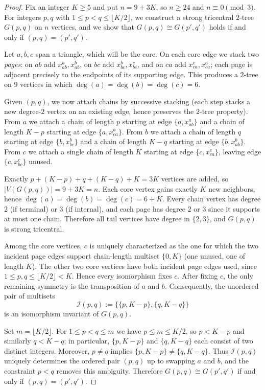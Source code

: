 \documentclass[12pt]{article}
\numberwithin{equation}{section}
\begin{document}
\begin{proof}
Fix an integer $K\ge 5$ and put $n=9+3K$, so $n\ge 24$ and $n\equiv 0\pmod 3$.
For integers $p,q$ with $1\le p<q\le \lfloor K/2\rfloor$, we construct a strong 
tricentral $2$-tree $G(p,q)$ on $n$ vertices, and we show that $G(p,q)\cong G(p',q')$ 
holds if and only if $(p,q)=(p',q')$.

Let $a,b,c$ span a triangle, which will be the core. On each core edge we stack 
two \emph{pages}: on $ab$ add $x_{ab}^a,x_{ab}^b$, on $bc$ add $x_{bc}^b,x_{bc}^c$, 
and on $ca$ add $x_{ca}^c,x_{ca}^a$; each page is adjacent precisely to the 
endpoints of its supporting edge. This produces a $2$-tree on $9$ vertices in 
which $\deg(a)=\deg(b)=\deg(c)=6$.

Given $(p,q)$, we now attach chains by successive stacking (each step stacks a 
new degree-$2$ vertex on an existing edge, hence preserves the $2$-tree property).
From $a$ we attach a chain of length $p$ starting at edge $\{a, x_{ab}^a\}$ and 
a chain of length $K-p$ starting at edge $\{a, x_{ca}^a\}$. From $b$ we attach 
a chain of length $q$ starting at edge $\{b, x_{bc}^b\}$ and a chain of length 
$K-q$ starting at edge $\{b, x_{ab}^b\}$. From $c$ we attach a single chain of 
length $K$ starting at edge $\{c, x_{ca}^c\}$, leaving edge $\{c, x_{bc}^c\}$ unused.

Exactly $p+(K-p)+q+(K-q)+K=3K$ vertices are added, so $|V(G(p,q))|=9+3K=n$.
Each core vertex gains exactly $K$ new neighbors, hence $\deg(a)=\deg(b)=\deg(c)=6+K$.
Every chain vertex has degree $2$ (if terminal) or $3$ (if internal), and each 
page has degree $2$ or $3$ since it supports at most one chain. Therefore all 
tail vertices have degree in $\{2,3\}$, and $G(p,q)$ is strong tricentral.

Among the core vertices, $c$ is uniquely characterized as the one for which the 
two incident page edges support chain-length multiset $\{0,K\}$ (one unused, one 
of length $K$). The other two core vertices have both incident page edges used, 
since $1\le p,q\le \lfloor K/2\rfloor <K$. Hence every isomorphism fixes $c$.
After fixing $c$, the only remaining symmetry is the transposition of $a$ and $b$.
Consequently, the unordered pair of multisets
\[
\mathcal{I}(p,q):=\bigl\{\{p,K-p\},\{q,K-q\}\bigr\}
\]
is an isomorphism invariant of $G(p,q)$.

Set $m=\lfloor K/2\rfloor$. For $1\le p<q\le m$ we have $p\le m\le K/2$, so 
$p<K-p$ and similarly $q<K-q$; in particular, $\{p,K-p\}$ and $\{q,K-q\}$ 
each consist of two distinct integers. Moreover, $p\neq q$ implies 
$\{p,K-p\}\neq \{q,K-q\}$. Thus $\mathcal{I}(p,q)$ uniquely determines the 
ordered pair $(p,q)$ up to swapping $a$ and $b$, and the constraint $p<q$ 
removes this ambiguity. Therefore $G(p,q)\cong G(p',q')$ if and only if $(p,q)=(p',q')$.


\end{proof}
\end{document}
